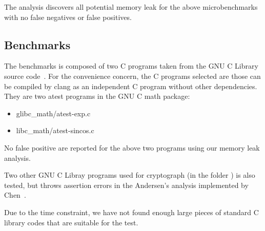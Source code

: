 The analysis discovers all potential memory leak for the above microbenchmarks 
with no false negatives or false positives.


\subsection{Benchmarks}
\label{benchmarks}

The benchmarks is composed of two C programs taken from the GNU C Library 
source code~\cite{glibc}. For the convenience concern, the C programs selected 
are those can be compiled by clang as an independent C program without other
dependencies. They are two atest programs in the GNU C math package:

\begin{itemize}
  \item glibc\_math/atest-exp.c
  \item libc\_math/atest-sincos.c
\end{itemize}

No false positive are reported for the above two programs using our memory leak 
analysis.

Two other GNU C Libray programs used for cryptograph (in the folder \crypt) 
is also tested, but throws assertion errors in the Andersen's 
analysis implemented by Chen~\cite{chen}.

Due to the time constraint, we have not found enough large pieces of standard C 
library codes that are suitable for the test.
